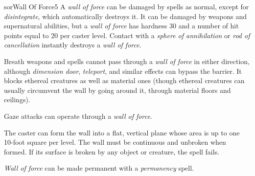 \begin{spellcard}{sor}{Wall Of Force}{5}
  A \emph{wall of force} can be damaged by spells as normal, except for \emph{disintegrate},
  which automatically destroys it.
  It can be damaged by weapons and supernatural abilities,
  but a \emph{wall of force} has hardness 30 and a number of hit points equal to 20 per caster level.
  Contact with a \emph{sphere of annihilation} or \emph{rod of cancellation}
  instantly destroys a \emph{wall of force}.

  Breath weapons and spells cannot pass through a \emph{wall of force} in either direction,
  although \emph{dimension door}, \emph{teleport}, and similar effects can bypass the barrier.
  It blocks ethereal creatures as well as material ones
  (though ethereal creatures can usually circumvent the wall by going around it,
  through material floors and ceilings).

  Gaze attacks can operate through a \emph{wall of force}.

  The caster can form the wall into a flat, vertical plane whose area is up to one 10-foot square per level.
  The wall must be continuous and unbroken when formed.
  If its surface is broken by any object or creature, the spell fails.

  \emph{Wall of force} can be made permanent with a \emph{permanency} spell.
\end{spellcard}
